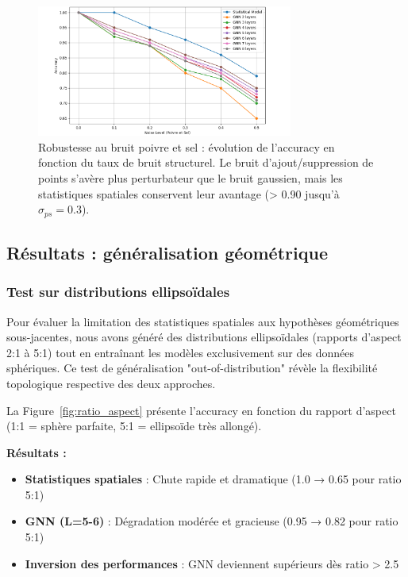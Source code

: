 \begin{figure}[htbp]
    \centering
    \includegraphics[width=0.75\textwidth]{../img/pepper.png}
    \caption{Robustesse au bruit poivre et sel : évolution de l'accuracy en fonction du taux de bruit structurel. Le bruit d'ajout/suppression de points s'avère plus perturbateur que le bruit gaussien, mais les statistiques spatiales conservent leur avantage (> 0.90 jusqu'à $\sigma_{ps}=0.3$).}
    \label{fig:noise_pepper}
\end{figure}

\subsection{Résultats : généralisation géométrique}

\subsubsection{Test sur distributions ellipsoïdales}

Pour évaluer la limitation des statistiques spatiales aux hypothèses géométriques sous-jacentes, nous avons généré des distributions ellipsoïdales (rapports d'aspect 2:1 à 5:1) tout en entraînant les modèles exclusivement sur des données sphériques. Ce test de généralisation "out-of-distribution" révèle la flexibilité topologique respective des deux approches.

La Figure~\ref{fig:ratio_aspect} présente l'accuracy en fonction du rapport d'aspect (1:1 = sphère parfaite, 5:1 = ellipsoïde très allongé).

\textbf{Résultats :}
\begin{itemize}
    \item \textbf{Statistiques spatiales} : Chute rapide et dramatique (1.0 → 0.65 pour ratio 5:1)
    \item \textbf{GNN (L=5-6)} : Dégradation modérée et gracieuse (0.95 → 0.82 pour ratio 5:1)
    \item \textbf{Inversion des performances} : GNN deviennent supérieurs dès ratio > 2.5
\end{itemize}

